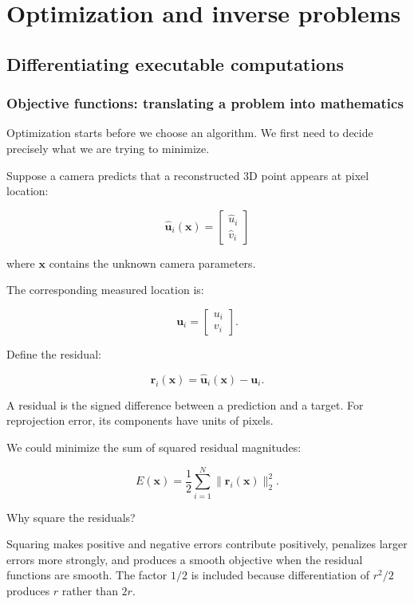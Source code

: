 \section{Optimization and inverse problems}\label{02-foundations-ii-ch026-optimization-and-inverse-problems}

\subsection{Differentiating executable computations}\label{02-foundations-ii-ch026-differentiating-executable-computations}

\subsubsection{Objective functions: translating a problem into mathematics}\label{02-foundations-ii-ch026-objective-functions-translating-a-problem-into-mathematics}

Optimization starts before we choose an algorithm. We first need to decide precisely what we are trying to minimize.

Suppose a camera predicts that a reconstructed 3D point appears at pixel location:

\[
\hat{\mathbf u}_i(\mathbf x)= \begin{bmatrix}\hat u_i\\\hat v_i\end{bmatrix}
\]

where \(\mathbf x\) contains the unknown camera parameters.

The corresponding measured location is:

\[
\mathbf u_i= \begin{bmatrix}u_i\\v_i\end{bmatrix}.
\]

Define the residual:

\[
\boxed{ \mathbf r_i(\mathbf x) = \hat{\mathbf u}_i(\mathbf x)-\mathbf u_i }.
\]

A residual is the signed difference between a prediction and a target. For reprojection error, its components have units of pixels.

We could minimize the sum of squared residual magnitudes:

\[
\boxed{ E(\mathbf x)= \frac12\sum_{i=1}^{N} \|\mathbf r_i(\mathbf x)\|_2^2 }.
\]

Why square the residuals?

Squaring makes positive and negative errors contribute positively, penalizes larger errors more strongly, and produces a smooth objective when the residual functions are smooth. The factor \(1/2\) is included because differentiation of \(r^2/2\) produces \(r\) rather than \(2r\).

